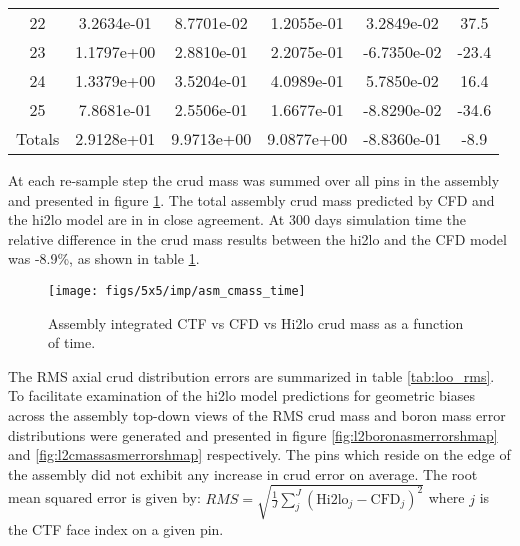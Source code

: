 \begin{table}[h]
\begin{center}
\begin{tabular}[h]{|c|c|c|c|c|c|}
22	 &3.2634e-01 & 8.7701e-02 & 1.2055e-01 & 3.2849e-02 & 37.5\\
23	 &1.1797e+00 & 2.8810e-01 & 2.2075e-01 & -6.7350e-02  & -23.4\\
24	 &1.3379e+00 & 3.5204e-01 & 4.0989e-01 & 5.7850e-02 & 16.4\\
25	 &7.8681e-01 & 2.5506e-01 & 1.6677e-01 & -8.8290e-02  & -34.6\\
\hline \hline
Totals	 & 2.9128e+01 & 9.9713e+00 & 9.0877e+00 & -8.8360e-01  & -8.9\\
\hline
\end{tabular}
\label{tab:loo_crud_cmass}
\end{center}
\end{table}


At each re-sample step the crud mass was summed over all pins in the assembly and presented in figure \ref{fig:asmcmasstime}.  The total assembly crud mass predicted by CFD and the hi2lo model are in in close agreement.  At 300 days simulation time the relative difference in the crud mass results between the hi2lo and the CFD model was -8.9\%, as shown in table \ref{tab:loo_crud_cmass}.

\begin{figure}[]
    \centering
    \texttt{[image: figs/5x5/imp/asm\_cmass\_time]}
    \caption{Assembly integrated CTF vs CFD vs Hi2lo crud mass as a function of time.}
    \label{fig:asmcmasstime}
\end{figure}

The RMS axial crud distribution errors are summarized in table \ref{tab:loo_rms}.  To facilitate examination of the hi2lo model predictions for geometric biases across the assembly top-down views of the RMS crud mass and boron mass error distributions were generated and presented in figure \ref{fig:l2boronasmerrorshmap} and \ref{fig:l2cmassasmerrorshmap} respectively.  The pins which reside on the edge of the assembly did not exhibit any increase in crud error on average.  The root mean squared error is given by: $RMS = \sqrt{\frac{1}{J}\sum^J_j(\mathrm{Hi2lo}_j - \mathrm{CFD}_j)^2}$ where $j$ is the CTF face index on a given pin.

